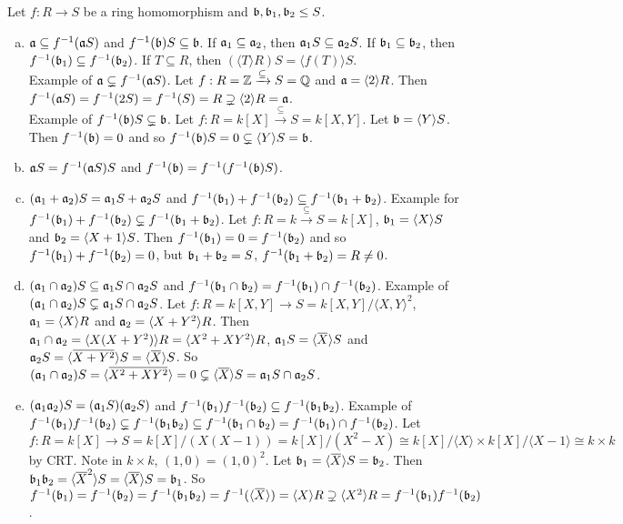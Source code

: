 \begin{proposition}
    Let $f: R \to S$ be a ring homomorphism and $\mathfrak{b},\mathfrak{b}_1,\mathfrak{b}_2 \leq S$.
    \begin{enumerate}[(a)]
        \item $\mathfrak{a} \subseteq f^{-1}(\mathfrak{a} S)$ and $f^{-1}(\mathfrak{b})S \subseteq \mathfrak{b}$. If $\mathfrak{a}_1 \subseteq \mathfrak{a}_2$, then $\mathfrak{a}_1S \subseteq \mathfrak{a}_2S$. If $\mathfrak{b}_1 \subseteq \mathfrak{b}_2$, then $f^{-1}(\mathfrak{b}_1) \subseteq f^{-1}(\mathfrak{b}_2)$. If $T \subseteq R$, then $(\langle T \rangle R) S = \langle f(T) \rangle S$. \\
            Example of $\mathfrak{a} \subsetneq f^{-1}(\mathfrak{a} S)$. Let $f: R = \mathbb{Z} \xrightarrow {\subseteq} S = \mathbb{Q}$ and $\mathfrak{a} = \langle 2 \rangle R$. Then $f^{-1}(\mathfrak{a} S) = f^{-1}(2S) = f^{-1}(S) = R \supsetneq \langle 2 \rangle R = \mathfrak{a}$. \\
            Example of $f^{-1}(\mathfrak{b})S \subsetneq \mathfrak{b}$. Let $f: R = k[X] \xrightarrow {\subseteq } S = k[X,Y]$. Let $\mathfrak{b} = \langle Y \rangle S$. Then $f^{-1}(\mathfrak{b}) = 0$ and so $f^{-1}(\mathfrak{b})S = 0 \subsetneq \langle Y \rangle S = \mathfrak{b}$.
        \item $\mathfrak{a} S = f^{-1}(\mathfrak{a} S)S$ and $f^{-1}(\mathfrak{b}) = f^{-1}(f^{-1}(\mathfrak{b})S)$.
        \item $(\mathfrak{a}_1 + \mathfrak{a}_2)S = \mathfrak{a}_1S + \mathfrak{a}_2S$ and $f^{-1}(\mathfrak{b}_1) + f^{-1}(\mathfrak{b}_2) \subseteq f^{-1}(\mathfrak{b}_1 + \mathfrak{b}_2)$. Example for $f^{-1}(\mathfrak{b}_1) + f^{-1}(\mathfrak{b}_2) \subsetneq f^{-1}(\mathfrak{b}_1+\mathfrak{b}_2)$. Let $f: R = k \xrightarrow \subseteq S = k[X]$, $\mathfrak{b}_1 = \langle X \rangle S$ and $\mathfrak{b}_2 = \langle X+1 \rangle S$. Then $f^{-1}(\mathfrak{b}_1) = 0 = f^{-1}(\mathfrak{b}_2)$ and so $f^{-1}(\mathfrak{b}_1) + f^{-1}(\mathfrak{b}_2) = 0$, but $\mathfrak{b}_1 + \mathfrak{b}_2 = S$, $f^{-1}(\mathfrak{b}_1 + \mathfrak{b}_2) = R \neq 0$.
        \item $(\mathfrak{a}_1 \cap \mathfrak{a}_2)S \subseteq \mathfrak{a}_1S \cap \mathfrak{a}_2S$ and $f^{-1}(\mathfrak{b}_1 \cap \mathfrak{b}_2) = f^{-1}(\mathfrak{b}_1) \cap f^{-1}(\mathfrak{b}_2)$. Example of $(\mathfrak{a}_1 \cap \mathfrak{a}_2)S \subsetneq \mathfrak{a}_1S \cap \mathfrak{a}_2S$. Let $f: R = k[X,Y] \to S = k[X,Y]/\langle X,Y \rangle^2$, $\mathfrak{a}_1 = \langle X \rangle R$ and $\mathfrak{a}_2 = \langle X+Y^2 \rangle R$. Then $\mathfrak{a}_1 \cap \mathfrak{a}_2 = \langle X(X+Y^2) \rangle R = \langle X^2 + XY^2 \rangle R$, $\ffa_1 S = \langle \overbar X \rangle S$ and $\ffa_2 S = \langle \overbar{X+Y^2} \rangle S = \langle \overbar X \rangle S$. So $(\ffa_1 \cap \ffa_2)S = \langle \overbar{X^2+XY^2} \rangle = 0 \subsetneq \langle \overline X \rangle S = \ffa_1 S \cap \ffa_2 S$.
        \item $(\mathfrak{a}_1\mathfrak{a}_2)S = (\mathfrak{a}_1S)(\mathfrak{a}_2S)$ and $f^{-1}(\mathfrak{b}_1)f^{-1}(\mathfrak{b}_2) \subseteq f^{-1}(\mathfrak{b}_1\mathfrak{b}_2)$. Example of $f^{-1}(\mathfrak{b}_1)f^{-1}(\mathfrak{b}_2) \subsetneq f^{-1}(\mathfrak{b}_1\mathfrak{b}_2) \subseteq f^{-1}(\mathfrak{b}_1 \cap \mathfrak{b}_2) = f^{-1}(\mathfrak{b}_1) \cap f^{-1}(\mathfrak{b}_2)$. Let $f: R = k[X] \to S = k[X]/(X(X-1)) = k[X]/(X^2-X) \cong k[X]/\langle X \rangle \times k[X]/\langle X-1 \rangle \cong k \times k$ by CRT. Note in $k \times k$, $(1,0) = (1,0)^2$. Let $\ffb_1 = \langle \overbar X \rangle S = \ffb_2$. Then $\mathfrak{b}_1 \mathfrak{b}_2 = \langle \overline X^2 \rangle S = \langle \overline X \rangle S = \mathfrak{b}_1$. So $f^{-1}(\ffb_1) = f^{-1}(\ffb_2) = f^{-1}(\ffb_1 \ffb_2) = f^{-1}(\langle \overbar X \rangle) = \langle X \rangle R \supsetneq \langle X^2 \rangle R = f^{-1}(\ffb_1)f^{-1}(\ffb_2)$.

\end{enumerate}
\end{proposition}
